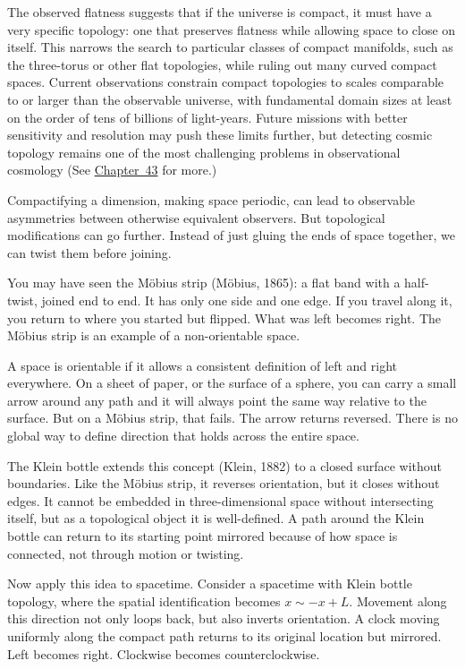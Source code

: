 The observed flatness suggests that if the universe is compact, it must have a very specific topology: one that preserves flatness while allowing space to close on itself. This narrows the search to particular classes of compact manifolds, such as the three-torus or other flat topologies, while ruling out many curved compact spaces. Current observations constrain compact topologies to scales comparable to or larger than the observable universe, with fundamental domain sizes at least on the order of tens of billions of light-years. Future missions with better sensitivity and resolution may push these limits further, but detecting cosmic topology remains one of the most challenging problems in observational cosmology (See \hyperref[ch:nearflatuniverse]{Chapter~43} for more.)

Compactifying a dimension, making space periodic, can lead to observable asymmetries between otherwise equivalent observers. But topological modifications can go further. Instead of just gluing the ends of space together, we can twist them before joining.

You may have seen the Möbius strip (Möbius, 1865): a flat band with a half-twist, joined end to end. It has only one side and one edge. If you travel along it, you return to where you started but flipped. What was left becomes right. The Möbius strip is an example of a non-orientable space.

A space is orientable if it allows a consistent definition of left and right everywhere. On a sheet of paper, or the surface of a sphere, you can carry a small arrow around any path and it will always point the same way relative to the surface. But on a Möbius strip, that fails. The arrow returns reversed. There is no global way to define direction that holds across the entire space.

The Klein bottle extends this concept (Klein, 1882) to a closed surface without boundaries. Like the Möbius strip, it reverses orientation, but it closes without edges. It cannot be embedded in three-dimensional space without intersecting itself, but as a topological object it is well-defined. A path around the Klein bottle can return to its starting point mirrored because of how space is connected, not through motion or twisting.

Now apply this idea to spacetime. Consider a spacetime with Klein bottle topology, where the spatial identification becomes $x \sim -x + L$. Movement along this direction not only loops back, but also inverts orientation. A clock moving uniformly along the compact path returns to its original location but mirrored. Left becomes right. Clockwise becomes counterclockwise.

